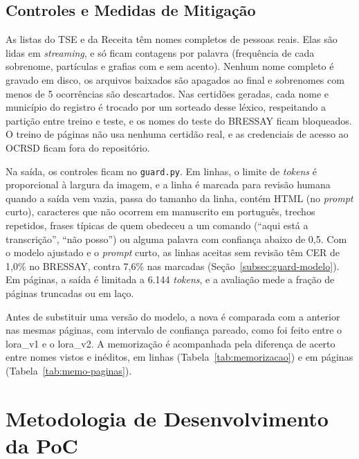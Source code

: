 \documentclass[12pt,a4paper]{article}
\begin{document}
\subsection{Controles e Medidas de Mitigação}
\label{subsec:controles}

As listas do TSE e da Receita têm nomes completos de pessoas reais. Elas são lidas em \emph{streaming}, e só ficam contagens por palavra (frequência de cada sobrenome, partículas e grafias com e sem acento). Nenhum nome completo é gravado em disco, os arquivos baixados são apagados ao final e sobrenomes com menos de 5 ocorrências são descartados. Nas certidões geradas, cada nome e município do registro é trocado por um sorteado desse léxico, respeitando a partição entre treino e teste, e os nomes do teste do BRESSAY ficam bloqueados. O treino de páginas não usa nenhuma certidão real, e as credenciais de acesso ao OCRSD ficam fora do repositório.

Na saída, os controles ficam no \texttt{guard.py}. Em linhas, o limite de \emph{tokens} é proporcional à largura da imagem, e a linha é marcada para revisão humana quando a saída vem vazia, passa do tamanho da linha, contém HTML (no \emph{prompt} curto), caracteres que não ocorrem em manuscrito em português, trechos repetidos, frases típicas de quem obedeceu a um comando (``aqui está a transcrição'', ``não posso'') ou alguma palavra com confiança abaixo de 0,5. Com o modelo ajustado e o \emph{prompt} curto, as linhas aceitas sem revisão têm CER de 1,0\% no BRESSAY, contra 7,6\% nas marcadas (Seção~\ref{subsec:guard-modelo}). Em páginas, a saída é limitada a 6.144 \emph{tokens}, e a avaliação mede a fração de páginas truncadas ou em laço.

Antes de substituir uma versão do modelo, a nova é comparada com a anterior nas mesmas páginas, com intervalo de confiança pareado, como foi feito entre o lora\_v1 e o lora\_v2. A memorização é acompanhada pela diferença de acerto entre nomes vistos e inéditos, em linhas (Tabela~\ref{tab:memorizacao}) e em páginas (Tabela~\ref{tab:memo-paginas}).

\section{Metodologia de Desenvolvimento da PoC}
\label{sec:metodologia}
\end{document}
